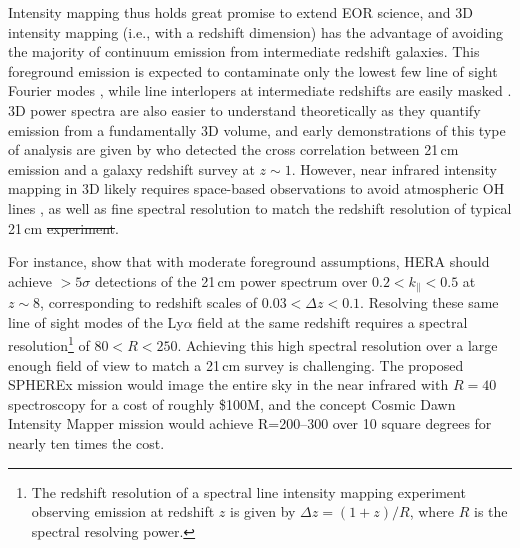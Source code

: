 \documentclass[numberedappendix]{emulateapj}
\providecommand{\DIFadd}[1]{{\protect\color{blue}\uwave{#1}}} %
\providecommand{\DIFdel}[1]{{\protect\color{red}\sout{#1}}}                      %
\providecommand{\DIFaddbegin}{} %
\providecommand{\DIFaddend}{} %
\providecommand{\DIFdelbegin}{} %
\providecommand{\DIFdelend}{} %
\begin{document}
Intensity mapping thus holds great promise to extend EOR science, and 3D intensity mapping (i.e., with a redshift dimension) has the advantage of avoiding the majority of continuum emission from intermediate redshift galaxies. This foreground emission is expected to contaminate only the lowest few line of sight Fourier modes \citep{gong17}, while line interlopers at intermediate redshifts are easily masked \citep{Gong2014,gong17,pullen14,Comaschi16}. 3D power spectra are also easier to understand theoretically as they quantify emission from a fundamentally 3D volume, and early demonstrations of this type of analysis are given by \citet{Chang2010,Masui2013} who detected the cross correlation between 21\,cm emission and a galaxy redshift survey at $z\sim1$. However, near infrared intensity mapping in 3D likely requires space-based observations to avoid atmospheric OH lines \citep[e.g.][]{sullivan12}, as well as fine spectral resolution to match the redshift resolution of typical 21\,cm \DIFdelbegin \DIFdel{experiment}\DIFdelend \DIFaddbegin \DIFadd{experiments}\DIFaddend . 

For instance, \citet{PoberNextGen} show that with moderate foreground assumptions, HERA should achieve $>5\sigma$ detections of the 21\,cm power spectrum 	over $0.2<k_\parallel<0.5$ at $z\sim8$, corresponding to redshift scales of $0.03<\Delta z<0.1$. Resolving these same line of sight modes of the Ly$\alpha$ field at the same redshift requires a spectral resolution\footnote{The redshift resolution of a spectral line intensity mapping experiment observing emission at redshift $z$ is given by $\Delta z=(1+z)/R$, where $R$ is the spectral resolving power.} of $80<R<250$. Achieving this high spectral resolution over a large enough field of view to match a 21\,cm survey is challenging. The proposed SPHEREx mission \citep{ScienceWithSpherex,SpherexWhitePaper} would image the entire sky in the near infrared with $R=40$ spectroscopy for a cost of roughly \$100M, and the concept Cosmic Dawn Intensity Mapper \citep{cooray16} mission would achieve R=200--300 over 10 square degrees for nearly ten times the cost.
\end{document}
